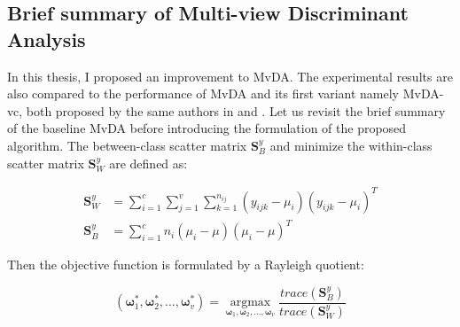 
\subsection{Brief summary of Multi-view Discriminant Analysis}
    In this thesis, I proposed an improvement to MvDA.
    The experimental results are also compared to the performance of MvDA and its first variant namely MvDA-vc, both proposed by the same authors in \cite{kan2015multi} and \cite{kan2016multi}.
    Let us revisit the brief summary of the baseline MvDA before introducing the formulation of the proposed algorithm.
    The between-class scatter matrix $\boldsymbol{S}_B^y$ and minimize the within-class scatter matrix $\boldsymbol{S}_W^y$ are defined as: 

    \begin{align}
        \boldsymbol{S}_W^y &= \sum_{i=1}^{c}\sum_{j=1}^{v}\sum_{k=1}^{n_{ij}}(y_{ijk}-\mu_i)(y_{ijk}-\mu_i)^T \label{eq:MvDA_Sw}\\
        \boldsymbol{S}_B^y &= \sum_{i=1}^{c}n_i(\mu_i - \mu)(\mu_i - \mu)^T \label{eq:MvDA_Sb}
    \end{align}

    Then the objective function is formulated by a Rayleigh quotient:

    \begin{equation}
        (\boldsymbol{\omega}_1^*,\boldsymbol{\omega}_2^*, ..., \boldsymbol{\omega}_v^*) = \operatorname*{argmax}_{\boldsymbol{\omega}_1, \boldsymbol{\omega}_2,..., \boldsymbol{\omega}_v}\frac{trace(\boldsymbol{S}_B^y)}{trace(\boldsymbol{S}_W^y)}
        \label{eq:MvDA}
    \end{equation}


